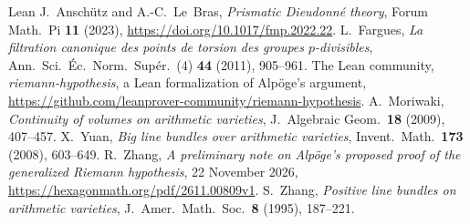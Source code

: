 \documentclass[reqno]{amsart}
\theoremstyle{definition}
\theoremstyle{plain}
\theoremstyle{remark}
\begin{document}
\begin{thebibliography}{Lean}
 J.~Ansch\"utz and A.-C.~Le~Bras, \emph{Prismatic Dieudonn\'e theory}, Forum Math.\ Pi \textbf{11} (2023), \url{https://doi.org/10.1017/fmp.2022.22}.
 L.~Fargues, \emph{La filtration canonique des points de torsion des groupes \(p\)-divisibles}, Ann.\ Sci.\ \'Ec.\ Norm.\ Sup\'er.\ (4) \textbf{44} (2011), 905--961.
 The Lean community, \emph{riemann-hypothesis}, a Lean formalization of Alp\"oge's argument, \url{https://github.com/leanprover-community/riemann-hypothesis}.
 A.~Moriwaki, \emph{Continuity of volumes on arithmetic varieties}, J.\ Algebraic Geom.\ \textbf{18} (2009), 407--457.
 X.~Yuan, \emph{Big line bundles over arithmetic varieties}, Invent.\ Math.\ \textbf{173} (2008), 603--649.
 R.~Zhang, \emph{A preliminary note on Alp\"oge's proposed proof of the generalized Riemann hypothesis}, 22 November 2026, \url{https://hexagonmath.org/pdf/2611.00809v1}.
 S.~Zhang, \emph{Positive line bundles on arithmetic varieties}, J.\ Amer.\ Math.\ Soc.\ \textbf{8} (1995), 187--221.
\end{thebibliography}
\end{document}
